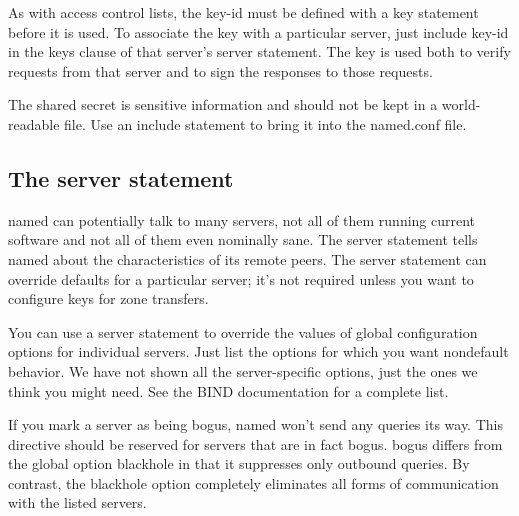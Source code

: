 
As with access control lists, the {key-id} must be defined with a {key}
statement before it is used. To associate the key with a particular
server, just include {key-id} in the {keys} clause of that server's
{server} statement. The key is used both to verify requests from that
server and to sign the responses to those requests.

The shared secret is sensitive information and should not be kept in a
world-readable file. Use an {include} statement to bring it into the
{named.conf} file.

\protect\hypertarget{part0024_split_040.html}{}{}

\hypertarget{part0024_split_040.htmlux5cux23_idContainer1069}{}
\hypertarget{part0024_split_040.htmlux5cux23calibre_pb_39}{%
\subsection[The {server}
statement]{\texorpdfstring{\protect\hypertarget{part0024_split_040.htmlux5cux23_idTextAnchor906}{}{}The
{server}
statement}{The server statement}}\label{part0024_split_040.htmlux5cux23calibre_pb_39}}

\protect\hypertarget{part0024_split_040.htmlux5cux23_idIndexMarker2180}{}{}{named}
can potentially talk to many servers, not all of them running current
software and not all of them even nominally sane. The {server} statement
tells {named} about the characteristics of its remote peers. The
{server} statement can override defaults for a particular server; it's
not required unless you want to configure keys for zone transfers.


You can use a {server} statement to override the values of global
configuration options for individual servers. Just list the options for
which you want nondefault behavior. We have not shown all the
server-specific options, just the ones we think you might need. See the
BIND documentation for a complete list.

\protect\hypertarget{part0024_split_040.htmlux5cux23_idTextAnchor907}{}{}If
you mark a server as being {bogus}, {named} won't send any queries its
way. This directive should be reserved for servers that are in fact
bogus. {bogus} differs from the global option {blackhole} in that it
suppresses only outbound queries. By contrast, the {blackhole} option
completely eliminates all forms of communication with the listed
servers.

